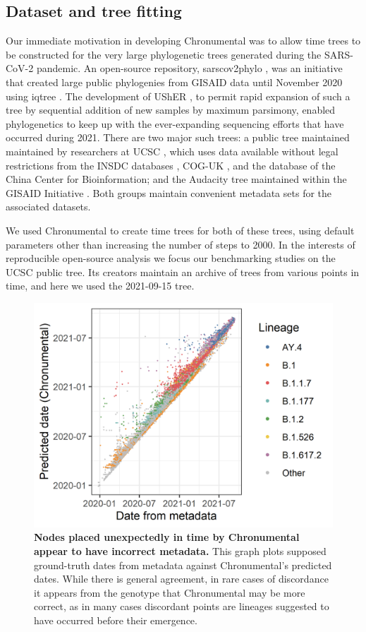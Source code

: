\subsection*{Dataset and tree fitting}

Our immediate motivation in developing Chronumental was to allow time trees to be constructed for the very large phylogenetic trees generated during the SARS-CoV-2 pandemic. An open-source repository, sarscov2phylo \citep{phylo}, was an initiative that created large public phylogenies from GISAID data until November 2020 using iqtree \citep{Minh2020-vc}. The development of UShER \citep{Turakhia2021-la}, to permit rapid expansion of such a tree by sequential addition of new samples by maximum parsimony, enabled phylogenetics to keep up with the ever-expanding sequencing efforts that have occurred during 2021. There are two major such trees: a public tree maintained maintained by researchers at UCSC \citep{McBroome2021-fn}, which uses data available without legal restrictions from the INSDC databases \citep{Arita2021-dc}, COG-UK \citep{Nicholls2021-fz}, and the database of the China Center for Bioinformation; and the Audacity tree maintained within the GISAID Initiative \citep{gisaid}. Both groups maintain convenient metadata sets for the associated datasets.

We used Chronumental to create time trees for both of these trees, using default parameters other than increasing the number of steps to 2000. In the interests of reproducible open-source analysis we focus our benchmarking studies on the UCSC public tree. Its creators maintain an archive of trees from various points in time, and here we used the 2021-09-15 tree.

\begin{figure}[t]
\centering
\includegraphics[width=1\linewidth]{Figures/anac.png}
\caption{\textbf{Nodes placed unexpectedly in time by Chronumental appear to have incorrect metadata.} This graph plots supposed ground-truth dates from metadata against Chronumental's predicted dates. While there is general agreement, in rare cases of discordance it appears from the genotype that Chronumental may be more correct, as in many cases discordant points are lineages suggested to have occurred before their emergence.
}
\label{anac}
\end{figure}


